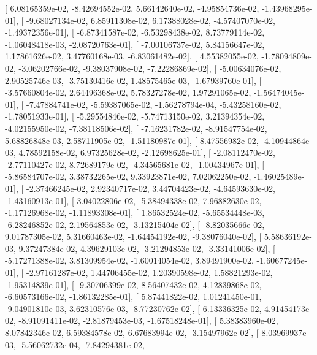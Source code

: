 \documentclass{article}
\begin{document}
       [  6.08165359e-02,  -8.42694552e-02,   5.66142640e-02,
         -4.95854736e-02,  -1.43968295e-01],
       [ -9.68027134e-02,   6.85911308e-02,   6.17388028e-02,
         -4.57407070e-02,  -1.49372356e-01],
       [ -6.87341587e-02,  -6.53298438e-02,   8.73779114e-02,
         -1.06048418e-03,  -2.08720763e-01],
       [ -7.00106737e-02,   5.84156647e-02,   1.17861626e-02,
          3.47760168e-03,  -6.83061482e-02],
       [  4.55382055e-02,  -1.78094809e-02,  -3.06202766e-02,
         -9.38037908e-02,  -7.22286869e-02],
       [ -5.00634076e-02,   2.90525746e-03,  -3.75130416e-02,
          1.48575465e-03,  -1.67939760e-01],
       [ -3.57660804e-02,   2.64496368e-02,   5.78327278e-02,
          1.97291065e-02,  -1.56474045e-01],
       [ -7.47884741e-02,  -5.59387065e-02,  -1.56278794e-04,
         -5.43258160e-02,  -1.78051933e-01],
       [ -5.29554846e-02,  -5.74713150e-02,   3.21394354e-02,
         -4.02155950e-02,  -7.38118506e-02],
       [ -7.16231782e-02,  -8.91547754e-02,   5.68826848e-03,
          2.58711905e-02,  -1.51180987e-01],
       [  8.47556982e-02,  -4.10944864e-03,   4.78592158e-02,
          6.97325628e-02,  -2.12698625e-01],
       [ -2.08112470e-02,  -2.77110427e-02,   8.72689179e-02,
         -4.34565681e-02,  -1.00434967e-01],
       [ -5.86584707e-02,   3.38732265e-02,   9.33923871e-02,
          7.02062250e-02,  -1.46025489e-01],
       [ -2.37466245e-02,   2.92340717e-02,   3.44704423e-02,
         -4.64593630e-02,  -1.43160913e-01],
       [  3.04022806e-02,  -5.38494338e-02,   7.96882630e-02,
         -1.17126968e-02,  -1.11893308e-01],
       [  1.86532524e-02,  -5.65534448e-03,  -6.28246852e-02,
          2.19564853e-02,  -3.13215404e-02],
       [ -8.82035666e-02,   9.01787305e-02,   5.31660463e-02,
         -1.64454192e-02,  -9.38076040e-02],
       [  5.58636192e-03,   9.37247384e-02,   4.39629103e-02,
         -3.21294853e-02,  -3.33141006e-02],
       [ -5.17271388e-02,   3.81309954e-02,  -1.60014054e-02,
          3.89491900e-02,  -1.60677245e-01],
       [ -2.97161287e-02,   1.44706455e-02,   1.20390598e-02,
          1.58821293e-02,  -1.95314839e-01],
       [ -9.30706399e-02,   8.56407432e-02,   4.12839868e-02,
         -6.60573166e-02,  -1.86132285e-01],
       [  5.87441822e-02,   1.01241450e-01,  -9.04901810e-03,
          3.62310576e-03,  -8.77230762e-02],
       [  6.13336325e-02,   4.91454173e-02,  -8.91091411e-02,
         -2.81879453e-03,  -1.67518248e-01],
       [  5.38383960e-02,   8.07842346e-02,   6.59384578e-02,
          6.67683994e-02,  -3.15497962e-02],
       [  8.03969937e-03,  -5.56062732e-04,  -7.84294381e-02,
\end{document}
